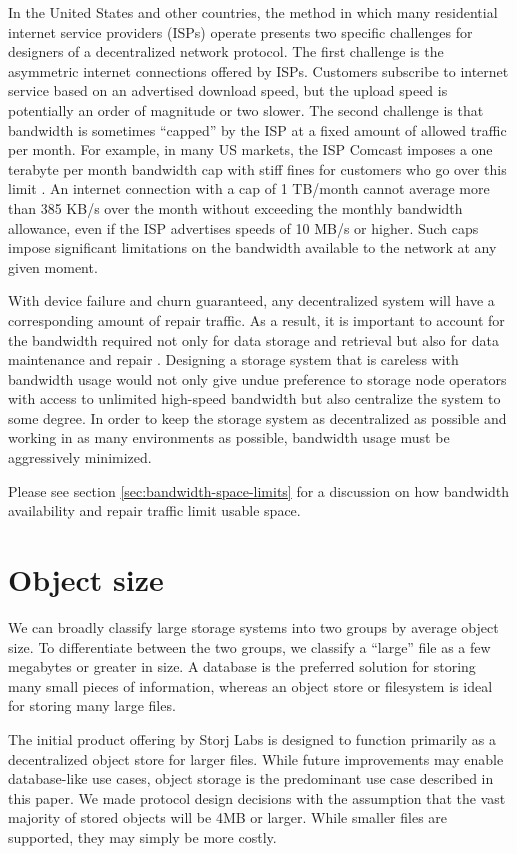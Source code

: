 \documentclass[8pt,fleqn,openany]{book}
\begin{document}
In the United States and other countries,
the method in which many residential internet service providers (ISPs)
operate presents two specific challenges for designers of a
decentralized network protocol. The first challenge is
the asymmetric internet connections offered by ISPs.
Customers subscribe to internet service
based on an advertised download speed, but the upload speed is potentially an
order of magnitude or two slower. The second challenge is that bandwidth is
sometimes ``capped'' by the ISP at a fixed amount of allowed traffic per month.
For example, in many
US markets, the ISP Comcast imposes a one terabyte per month bandwidth cap
with stiff fines for customers who go over this limit \cite{comcast-cap}.
An internet connection with a cap of 1 TB/month cannot average more than
385 KB/s over the month without exceeding the monthly bandwidth allowance,
even if the ISP advertises speeds of 10 MB/s or higher.
Such caps impose
significant limitations on the bandwidth available to the network
at any given moment.

With device failure and churn guaranteed, any decentralized system will have a
corresponding amount of repair traffic. As a result, it is important to account
for the bandwidth required not only for data storage and retrieval but also
for data maintenance and repair \cite{pick2-churn}. Designing a
storage system that is careless with bandwidth usage would not only give undue
preference to storage node operators with access to unlimited high-speed
bandwidth but also centralize the system to some degree. In order to keep the storage
system as decentralized as possible and working in as many environments
as possible, bandwidth usage must be aggressively minimized.

Please see section \ref{sec:bandwidth-space-limits} for a discussion on how
bandwidth availability and repair traffic limit usable space.

\section{Object size}

We can broadly classify large storage systems into two groups by average
object size. To differentiate between the two groups, we classify a ``large'' file as a
few megabytes or greater in size. A database is the
preferred solution for storing many small pieces of information,
whereas an object store or filesystem is ideal for storing many large files.

The initial product offering by Storj Labs is designed to function primarily as
a decentralized object store for larger files.
While future improvements may enable
database-like use cases, object storage is the predominant use case described in
this paper. We made protocol design decisions with the assumption that the
vast majority of stored objects will be 4MB or larger. While smaller files are
supported, they may simply be more costly.
\end{document}

